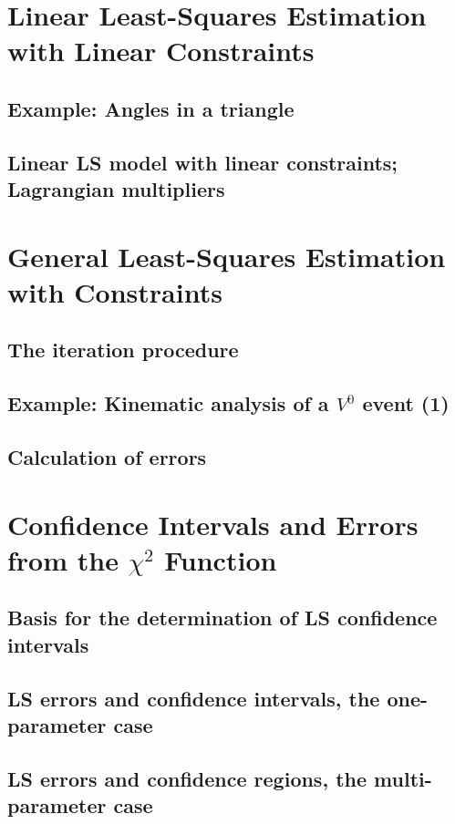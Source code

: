 \documentclass[../main.tex]{subfiles}
\begin{document}
\section{Linear Least-Squares Estimation with Linear Constraints} \label{sec:10.7}
\subsection{Example: Angles in a triangle} \label{sec:10.7.1}
\subsection{Linear LS model with linear constraints; Lagrangian multipliers} \label{sec:10.7.2}

\section{General Least-Squares Estimation with Constraints} \label{sec:10.8}
\subsection{The iteration procedure} \label{sec:10.8.1}
\subsection{Example: Kinematic analysis of a $V^0$ event (1)} \label{sec:10.8.2}
\subsection{Calculation of errors} \label{sec:10.8.3}

\section{Confidence Intervals and Errors from the $\chi^2$ Function} \label{sec:10.9}
\subsection{Basis for the determination of LS confidence intervals} \label{sec:10.9.1}
\subsection{LS errors and confidence intervals, the one-parameter case} \label{sec:10.9.2}
\subsection{LS errors and confidence regions, the multi-parameter case} \label{sec:10.9.3}
\end{document}
